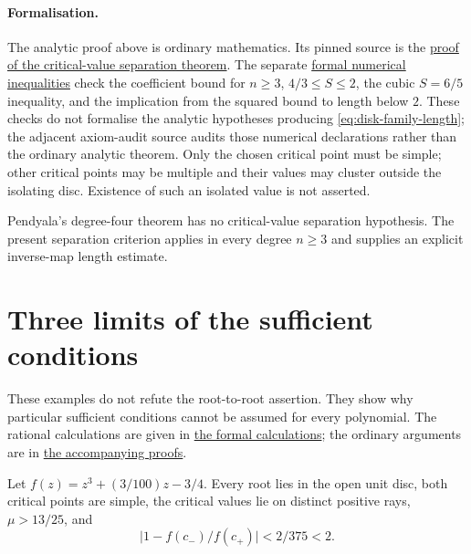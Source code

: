 \documentclass[11pt]{article}
\begin{document}
\paragraph{Formalisation.}\label{bdry:critical-value-separation}
The analytic proof above is ordinary mathematics. Its pinned source is the
\href{https://github.com/wcook04/plectis-erdos/blob/8efbccc235df64a38d83f5dc7b1949e2ad18270d/research_corpus/Erdos1041/problem/DiskFamilyCriticalValueSeparation.md}{proof of the critical-value separation theorem}.
The separate
\href{https://github.com/wcook04/plectis-erdos/blob/f36e325c8b05fe5c3ce8a2ca32a699f6dc6336b9/ErdosProblems/Erdos1041/DiskFamilyCriticalValueSeparation.lean}{formal numerical inequalities}
check the coefficient bound for $n\ge3$, $4/3\le S\le2$, the cubic
$S=6/5$ inequality, and the implication from the squared bound to length below
$2$. These checks do not formalise the analytic hypotheses producing
\eqref{eq:disk-family-length}; the adjacent axiom-audit source audits those
numerical declarations rather than the ordinary analytic theorem.
Only the chosen critical point must be simple; other critical points may
be multiple and their values may cluster outside the isolating disc.
Existence of such an isolated value is not asserted.

Pendyala's degree-four theorem \cite[Thm.~1]{june2026} has no
critical-value separation hypothesis.  The present separation criterion applies in
every degree $n\ge3$ and supplies an explicit inverse-map length estimate.


\section{Three limits of the sufficient conditions}
\label{sec:exact-obstructions}

These examples do not refute the root-to-root assertion. They show why
particular sufficient conditions cannot be assumed for every polynomial.
The rational calculations are given in
\href{https://github.com/wcook04/plectis-erdos/blob/f36a98bf3d3e6f65f1074e3b800e3293d5b8a51a/ErdosProblems/Erdos1041/RevisionR2ExactCores.lean}{the formal calculations}; the ordinary
arguments are in
\href{https://github.com/wcook04/plectis-erdos/blob/f36a98bf3d3e6f65f1074e3b800e3293d5b8a51a/ErdosProblems/Erdos1041/ExactObstructionsR2.md}{the accompanying proofs}.

\begin{proposition}
\label{res:sep-or-false}
Let $f(z)=z^3+(3/100)z-3/4$.  Every root lies in the open unit disc, both
critical points are simple, the critical values lie on distinct positive
rays, $\mu>13/25$, and
\[
 \bigl|1-f(c_-)/f(c_+)\bigr|<2/375<2.
\]
\end{proposition}
\end{document}
